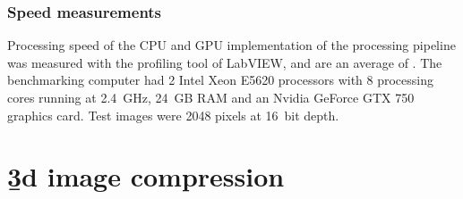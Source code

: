   \subsubsection{Speed measurements}
  Processing speed of the CPU and GPU implementation of the processing pipeline was measured with the profiling tool of LabVIEW, and are an average of . The benchmarking computer had 2 Intel Xeon E5620 processors with 8 processing cores running at \SI{2.4}{GHz}, \SI{24}{GB} RAM and an Nvidia GeForce GTX 750 graphics card. Test images were 2048 pixels at \SI{16}{bit} depth. 

  










  
\section{\b3d image compression}


